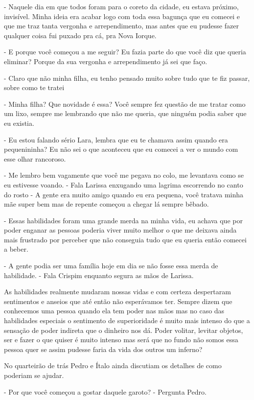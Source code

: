 - Naquele dia em que todos foram para o coreto da cidade, eu estava próximo, invisível. Minha ideia era acabar logo com toda essa bagunça que eu comecei e que me traz tanta vergonha e arrependimento, mas antes que eu pudesse fazer qualquer coisa fui puxado pra cá, pra Nova Iorque.

- E porque você começou a me seguir? Eu fazia parte do que você diz que queria eliminar? Porque da sua vergonha e arrependimento já sei que faço.

- Claro que não minha filha, eu tenho pensado muito sobre tudo que te fiz passar, sobre como te tratei

- Minha filha? Que novidade é essa? Você sempre fez questão de me tratar como um lixo, sempre me lembrando que não me queria, que ninguém podia saber que eu existia.

- Eu estou falando sério Lara, lembra que eu te chamava assim quando era pequenininha? Eu não sei o que aconteceu que eu comecei a ver o mundo com esse olhar rancoroso.

- Me lembro bem vagamente que você me pegava no colo, me levantava como se eu estivesse voando. - Fala Larissa enxugando uma lagrima escorrendo no canto do rosto - A gente era muito amigo quando eu era pequena, você tratava minha mãe super bem mas de repente começou a chegar lá sempre bêbado.

- Essas habilidades foram uma grande merda na minha vida, eu achava que por poder enganar as pessoas poderia viver muito melhor o que me deixava ainda mais frustrado por perceber que não conseguia tudo que eu queria então comecei a beber.

- A gente podia ser uma família hoje em dia se não fosse essa merda de habilidade. - Fala Crispim enquanto segura as mãos de Larissa.

As habilidades realmente mudaram nossas vidas e com certeza despertaram sentimentos e anseios que até então não esperávamos ter. Sempre dizem que conhecemos uma pessoa quando ela tem poder nas mãos mas no caso das habilidades especiais o sentimento de superioridade é muito mais intenso do que a sensação de poder indireta que o dinheiro nos dá. Poder volitar, levitar objetos, ser e fazer o que quiser é muito intenso mas será que no fundo não somos essa pessoa quer se assim pudesse faria da vida dos outros um inferno?

No quarteirão de trás Pedro e Ítalo ainda discutiam os detalhes de como poderiam se ajudar.

- Por que você começou a gostar daquele garoto? - Pergunta Pedro.


